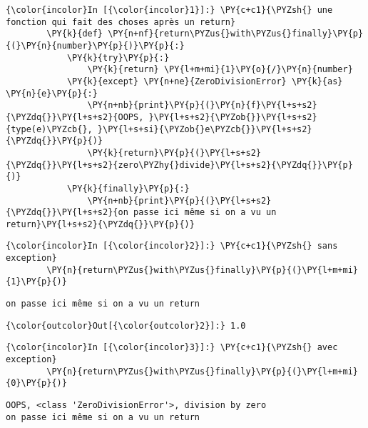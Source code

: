     \begin{Verbatim}[commandchars=\\\{\}]
{\color{incolor}In [{\color{incolor}1}]:} \PY{c+c1}{\PYZsh{} une fonction qui fait des choses après un return}
        \PY{k}{def} \PY{n+nf}{return\PYZus{}with\PYZus{}finally}\PY{p}{(}\PY{n}{number}\PY{p}{)}\PY{p}{:}
            \PY{k}{try}\PY{p}{:}
                \PY{k}{return} \PY{l+m+mi}{1}\PY{o}{/}\PY{n}{number}
            \PY{k}{except} \PY{n+ne}{ZeroDivisionError} \PY{k}{as} \PY{n}{e}\PY{p}{:}
                \PY{n+nb}{print}\PY{p}{(}\PY{n}{f}\PY{l+s+s2}{\PYZdq{}}\PY{l+s+s2}{OOPS, }\PY{l+s+s2}{\PYZob{}}\PY{l+s+s2}{type(e)\PYZcb{}, }\PY{l+s+si}{\PYZob{}e\PYZcb{}}\PY{l+s+s2}{\PYZdq{}}\PY{p}{)}
                \PY{k}{return}\PY{p}{(}\PY{l+s+s2}{\PYZdq{}}\PY{l+s+s2}{zero\PYZhy{}divide}\PY{l+s+s2}{\PYZdq{}}\PY{p}{)}
            \PY{k}{finally}\PY{p}{:}
                \PY{n+nb}{print}\PY{p}{(}\PY{l+s+s2}{\PYZdq{}}\PY{l+s+s2}{on passe ici même si on a vu un return}\PY{l+s+s2}{\PYZdq{}}\PY{p}{)}
\end{Verbatim}


    \begin{Verbatim}[commandchars=\\\{\}]
{\color{incolor}In [{\color{incolor}2}]:} \PY{c+c1}{\PYZsh{} sans exception}
        \PY{n}{return\PYZus{}with\PYZus{}finally}\PY{p}{(}\PY{l+m+mi}{1}\PY{p}{)}
\end{Verbatim}


    \begin{Verbatim}[commandchars=\\\{\}]
on passe ici même si on a vu un return

    \end{Verbatim}

\begin{Verbatim}[commandchars=\\\{\}]
{\color{outcolor}Out[{\color{outcolor}2}]:} 1.0
\end{Verbatim}
            
    \begin{Verbatim}[commandchars=\\\{\}]
{\color{incolor}In [{\color{incolor}3}]:} \PY{c+c1}{\PYZsh{} avec exception}
        \PY{n}{return\PYZus{}with\PYZus{}finally}\PY{p}{(}\PY{l+m+mi}{0}\PY{p}{)}
\end{Verbatim}


    \begin{Verbatim}[commandchars=\\\{\}]
OOPS, <class 'ZeroDivisionError'>, division by zero
on passe ici même si on a vu un return

    \end{Verbatim}


